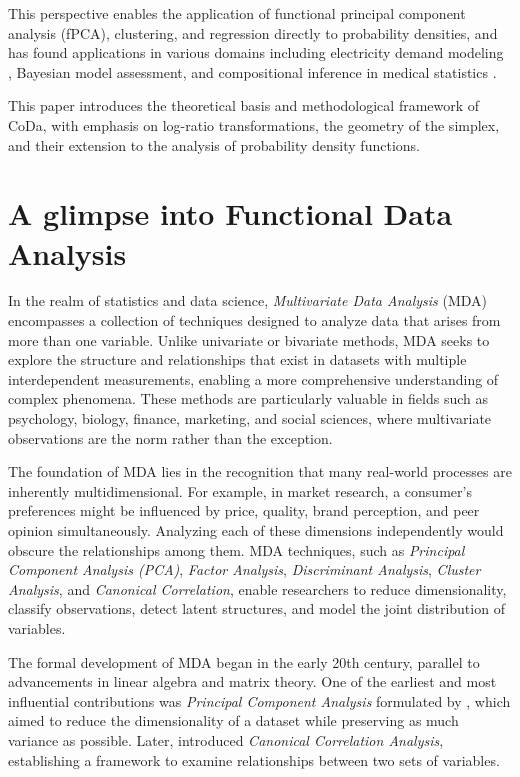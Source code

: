 \documentclass[
	12pt,				%
	oneside,			%
	a4paper,			%
	english,			%
	brazil				%
	]{abntex2ppgsi}
\begin{document}
This perspective enables the application of functional principal component analysis (fPCA), clustering, and regression directly to probability densities, and has found applications in various domains including electricity demand modeling \cite{delicado2011compositional}, Bayesian model assessment, and compositional inference in medical statistics \cite{talska2018principal}.

This paper introduces the theoretical basis and methodological framework of CoDa, with emphasis on log-ratio transformations, the geometry of the simplex, and their extension to the analysis of probability density functions.


\section{A glimpse into Functional Data Analysis}
In the realm of statistics and data science, \textit{Multivariate Data Analysis} (MDA) encompasses a collection of techniques designed to analyze data that arises from more than one variable. Unlike univariate or bivariate methods, MDA seeks to explore the structure and relationships that exist in datasets with multiple interdependent measurements, enabling a more comprehensive understanding of complex phenomena. These methods are particularly valuable in fields such as psychology, biology, finance, marketing, and social sciences, where multivariate observations are the norm rather than the exception.

The foundation of MDA lies in the recognition that many real-world processes are inherently multidimensional. For example, in market research, a consumer's preferences might be influenced by price, quality, brand perception, and peer opinion simultaneously. Analyzing each of these dimensions independently would obscure the relationships among them. MDA techniques, such as \textit{Principal Component Analysis (PCA)}, \textit{Factor Analysis}, \textit{Discriminant Analysis}, \textit{Cluster Analysis}, and \textit{Canonical Correlation}, enable researchers to reduce dimensionality, classify observations, detect latent structures, and model the joint distribution of variables.

The formal development of MDA began in the early 20th century, parallel to advancements in linear algebra and matrix theory. One of the earliest and most influential contributions was \textit{Principal Component Analysis} formulated by , which aimed to reduce the dimensionality of a dataset while preserving as much variance as possible. Later,  introduced \textit{Canonical Correlation Analysis}, establishing a framework to examine relationships between two sets of variables.
\end{document}
